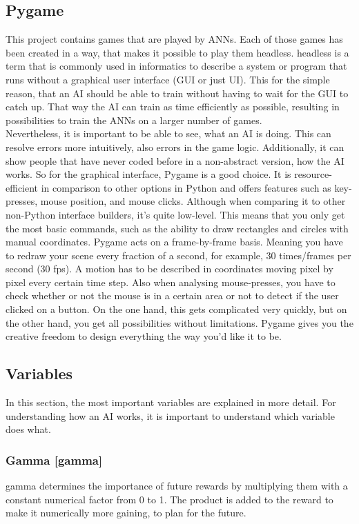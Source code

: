\documentclass[12pt]{article}
\def\gamma{gamma}%
\def\({}%
\def\){}%
\begin{document}
\subsection{Pygame}
This project contains games that are played by \glspl{ANN}. Each of those games has been created in a way, that makes it possible to play them \gls{headless}. \Gls{headless} is a term that is commonly used in informatics to describe a system or program that runs without a graphical user interface (GUI or just UI). This for the simple reason, that an \gls{AI} should be able to train without having to wait for the GUI to catch up. That way the \gls{AI} can train as time efficiently as possible, resulting in possibilities to train the \glspl{ANN} on a larger number of games. \\
Nevertheless, it is important to be able to see, what an \gls{AI} is doing. This can resolve errors more intuitively, also errors in the game logic. Additionally, it can show people that have never coded before in a non-abstract version, how the \gls{AI} works. So for the graphical interface, Pygame \cite{PyGame} is a good choice. It is resource-efficient in comparison to other options in Python and offers features such as key-presses, mouse position, and mouse clicks. Although when comparing it to other non-Python interface builders, it's quite \gls{low-level}. This means that you only get the most basic commands, such as the ability to draw rectangles and circles with manual coordinates. Pygame acts on a frame-by-frame basis. Meaning you have to redraw your scene every fraction of a second, for example, 30 times/frames per second (30 fps). A motion has to be described in coordinates moving pixel by pixel every certain time step. Also when analysing mouse-presses, you have to check whether or not the mouse is in a certain area or not to detect if the user clicked on a button. On the one hand, this gets complicated very quickly, but on the other hand, you get all possibilities without limitations. Pygame gives you the creative freedom to design everything the way you'd like it to be. \cite{PyGame}

\subsection{Variables} \label{sec:variables}
In this section, the most important variables are explained in more detail. For understanding how an AI works, it is important to understand which variable does what.
\subsubsection{Gamma [\(\gamma\)]}\label{sssec:gamma}
\Gls{gamma} determines the importance of future \glspl{reward} by multiplying them with a constant numerical factor from 0 to 1. The product is added to the \gls{reward} to make it numerically more gaining, to plan for the future.
\end{document}
